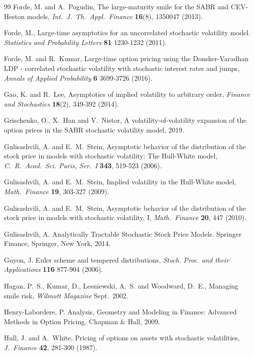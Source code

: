 \documentclass[11pt]{article}
\numberwithin{equation}{section}
\theoremstyle{plain}
\begin{document}
\begin{thebibliography}{99}
Forde, M. and A.~Pogudin, 
The large-maturity smile for the SABR and CEV-Heston models, 
\textit{Int.~J.~Th.~Appl.~Finance}
\textbf{16}(8), 1350047 (2013).


Forde, M., 
Large-time asymptotics for an uncorrelated stochastic volatility model.
\textit{Statistics and Probability Letters}
\textbf{81} 1230-1232 (2011).

Forde, M. and R.~Kumar, 
Large-time option pricing using the Donsker-Varadhan LDP - correlated
stochastic volatility with stochastic interest rates and jumps,
\textit{Annals  of Applied Probability}
\textbf{6} 3699-3726 (2016).

Gao, K. and R.~Lee, 
Asymptotics of implied volatility to arbitrary order, 
\textit{Finance and Stochastics}
\textbf{18}(2), 349-392 (2014).

Grischenko, O., X.~Han and V.~Nistor,
A volatility-of-volatility expansion of the option prices in the SABR 
stochastic volatility model, 2019.

Gulisashvili, A. and E.~M.~Stein, 
Asymptotic behavior of the distribution of the stock price in models with
stochastic volatility: The Hull-White model, 
\textit{C.~R.~Acad.~Sci. Paris, Ser.~I} 
\textbf{343}, 519-523 (2006).

Gulisashvili, A. and E.~M.~Stein, 
Implied volatility in the Hull-White model, 
\textit{Math.~Finance} 
\textbf{19}, 303-327 (2009).

Gulisashvili, A. and E.~M.~Stein, 
Asymptotic behavior of the distribution of the stock price in models with
stochastic volatility, I,
\textit{Math.~Finance} 
\textbf{20}, 447 (2010).

Gulisashvili, A.  
Analytically Tractable Stochastic Stock Price Models.
Springer Finance, Springer, New York, 2014.

Guyon, J.
Euler scheme and tempered distributions, 
\textit{Stoch. Proc. and their Applications}
\textbf{116} 877-904 (2006).

Hagan, P.~S., Kumar, D., Lesniewski, A.~S. and Woodward, D.~E.,
Managing smile risk, 
\textit{Wilmott Magazine} Sept.~2002.

Henry-Labordere, P.
Analysis, Geometry and Modeling in Finance: Advanced Methods in Option Pricing.
Chapman \& Hall, 2009.

Hull, J. and A.~White, 
Pricing of options on assets with stochastic volatilities,
\textit{J.~Finance} 
\textbf{42}, 281-300 (1987).


\end{thebibliography}
\end{document}
